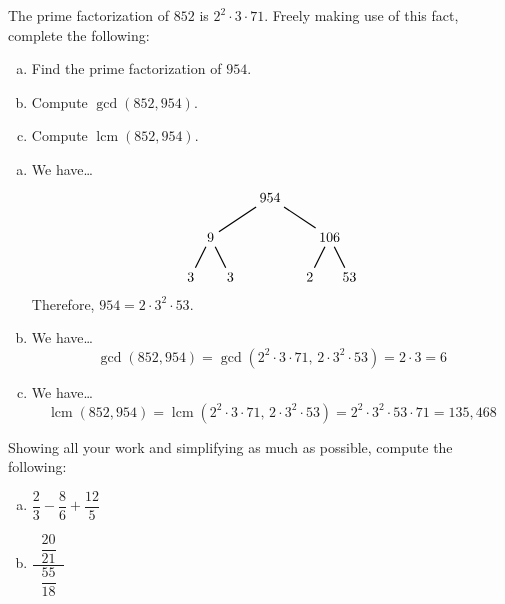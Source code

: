 \documentclass[12pt,letterpaper]{exam}
\DeclareMathOperator{\lcm}{lcm} %
\begin{document}
\examtitle
{} 
\scores
\bottomline
\newpage


\begin{questions}

\newpage
\question[10] The prime factorization of $852$ is $2^2 \cdot 3 \cdot 71$. Freely making use of this fact, complete the following:
	\begin{enumerate}[(a)]
	\item Find the prime factorization of $954$.
	\item Compute $\gcd(852, 954)$.
	\item Compute $\lcm(852, 954)$. 
	\end{enumerate} \pspace

\sol 
\begin{enumerate}[(a)]
\item We have\dots
	\[
	\begin{tikzpicture}
	\node at (0,0) (n) {954};
	\node at (-1.5,-1) (a) {9};
	\node at (1.5,-1) (b) {106};
	\node at (-2,-2) (c) {3};
	\node at (-1,-2) (d) {3};
	\node at (1,-2) (e) {2};
	\node at (2,-2) (f) {53};
	
	\draw[line width=0.03cm] (n) -- (a);
	\draw[line width=0.03cm] (n) -- (b);
	\draw[line width=0.03cm] (a) -- (c);
	\draw[line width=0.03cm] (a) -- (d);
	\draw[line width=0.03cm] (b) -- (e);
	\draw[line width=0.03cm] (b) -- (f);
	\end{tikzpicture}
	\]
Therefore, $954= 2 \cdot 3^2 \cdot 53$. \pspace

\item We have\dots
	\[
	\gcd(852, 954)= \gcd(2^2 \cdot 3 \cdot 71, \, 2 \cdot 3^2 \cdot 53)= 2 \cdot 3= 6
	\] \pspace

\item We have\dots
	\[
	\lcm(852, 954)= \lcm(2^2 \cdot 3 \cdot 71, \, 2 \cdot 3^2 \cdot 53)= 2^2 \cdot 3^2 \cdot 53 \cdot 71= 135,\!468
	\]
\end{enumerate}



\newpage
\question[10] Showing all your work and simplifying as much as possible, compute the following:
	\begin{enumerate}[(a)]
	\item $\dfrac{2}{3} - \dfrac{8}{6} + \dfrac{12}{5}$ \par\vspace{0.3cm}
	\item $\dfrac{\;\;\dfrac{20}{21}\;\;}{\;\;\dfrac{55}{18}\;\;}$
	\end{enumerate} \pspace


\end{questions}
\end{document}

